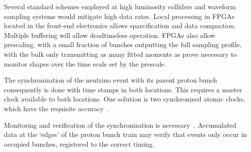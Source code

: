 Several standard schemes employed at high
luminosity colliders and waveform sampling systems would mitigate high
data rates. Local processing in FPGAs located in the front-end
electronics allows sparcification and data compaction. Multiple buffering will allow deadtimeless
operation.  FPGAs also allow prescaling, with a small fraction of
bunches outputting the full sampling profile, with the bulk only
transmitting as many fitted moments as prove necessary to monitor
shapes over the time scale set by the prescale.

The synchronization of the neutrino event with its parent proton bunch
consequently is done with time stamps in both locations. This requires
a master clock available to both locations. One solution is two
synchronized atomic clocks, which have the requisite
accuracy~\cite{atomic_clocks}. 

Monitoring and verification of the synchronization is
necessary~\cite{speedy_italians}. Accumulated data at the `edges' of the
proton bunch train may verify that events only occur in occupied
bunches, registered to the correct timing.

